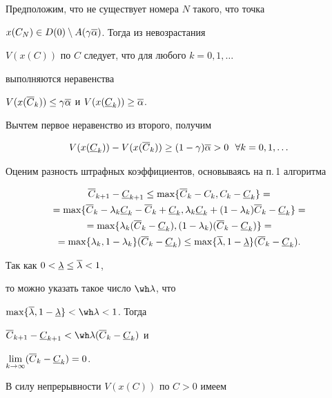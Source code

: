 \begin{pf}


Предположим, что не существует номера $N$ такого, что точка 


$x(C_N)\in D(0)\setminus A(\gamma \overline\alpha)$. Тогда из невозрастания


$V(x(C))$ по $C$ следует, что для любого $k=0,1,\dotsc$ 


выполняются неравенства


$V(x(\overline C_k))\leq\gamma \overline\alpha$ и $V(x(\underline C_k))\geq \overline\alpha$. 


Вычтем первое неравенство из второго, получим


\begin{equation}\label{raz}


V(x(\u C_k))-V(x(\o C_k))\geq (1-\gamma)\o\alpha>0 \ \ \forall k=0,1,\dotsc


\end{equation}





Оценим разность штрафных коэффициентов, основываясь на п.\,1 алгоритма


\begin{multline*}


\o C_{k+1}-\u C_{k+1}\leq\max\{\o C_k-C_k, C_k-\u C_k\}= \\


%


=\max\{\o C_k-\lambda_k\u C_k-\o C_k+\u C_k,


\lambda_k\u C_k+(1-\lambda_k)\o C_k-\u C_k\}=\\


=\max\{\lambda_k(\o C_k-\u C_k),(1-\lambda_k)(\o C_k-\u C_k)\}=\\


=\max\{\lambda_k,1-\lambda_k\}(\o C_k-\u C_k)\leq


\max\{\o\lambda,1-\u\lambda\}(\o C_k-\u C_k).


\end{multline*}


Так как $0<\underline\lambda\leq\overline\lambda<1$, 


то можно указать такое число $\wh\lambda$, что


$\max\{\o\lambda,1-\u\lambda\}<\wh\lambda<1$. Тогда 


$\o C_{k+1}-\u C_{k+1}<\wh\lambda(\o C_k-\u C_k)$ и


$\lim\limits_{k\to\infty}(\overline C_k-\underline C_k)=0$.


В силу непрерывности $V(x(C))$ по $C>0$ имеем



\end{pf}
